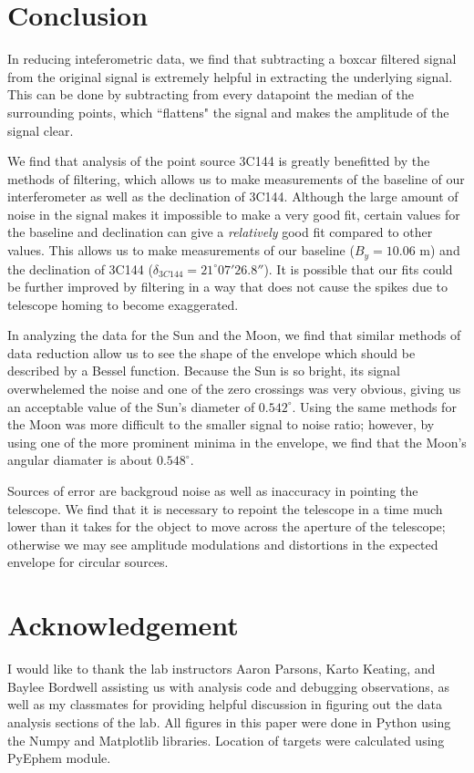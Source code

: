 \documentclass[12pt]{article}
\begin{document}
\section{Conclusion}
In reducing inteferometric data, we find that subtracting a boxcar filtered signal from the original signal is extremely helpful in extracting the underlying signal. This can be done by subtracting from every datapoint the median of the surrounding points, which ``flattens" the signal and makes the amplitude of the signal clear.

We find that analysis of the point source 3C144 is greatly benefitted by the methods of filtering, which allows us to make measurements of the baseline of our interferometer as well as the declination of 3C144. Although the large amount of noise in the signal makes it impossible to make a very good fit, certain values for the baseline and declination can give a \textit{relatively} good fit compared to other values. This allows us to make measurements of our baseline ($B_y = 10.06$ m) and the declination of 3C144 ($\delta_{3C144} = 21^\circ 07'26.8''$). It is possible that our fits could be further improved by filtering in a way that does not cause the spikes due to telescope homing to become exaggerated.

In analyzing the data for the Sun and the Moon, we find that similar methods of data reduction allow us to see the shape of the envelope which should be described by a Bessel function. Because the Sun is so bright, its signal overwhelemed the noise and one of the zero crossings was very obvious, giving us an acceptable value of the Sun's diameter of $0.542^\circ$. Using the same methods for the Moon was more difficult to the smaller signal to noise ratio; however, by using one of the more prominent minima in the envelope, we find that the Moon's angular diamater is about $0.548^\circ$.

Sources of error are backgroud noise as well as inaccuracy in pointing the telescope. We find that it is necessary to repoint the telescope in a time much lower than it takes for the object to move across the aperture of the telescope; otherwise we may see amplitude modulations and distortions in the expected envelope for circular sources.

\section{Acknowledgement}
I would like to thank the lab instructors Aaron Parsons, Karto Keating, and Baylee Bordwell assisting us with analysis code and debugging observations, as well as my classmates for providing helpful discussion in figuring out the data analysis sections of the lab. 
All figures in this paper were done in Python using the Numpy and Matplotlib libraries. Location of targets were calculated using PyEphem module.
\end{document}
